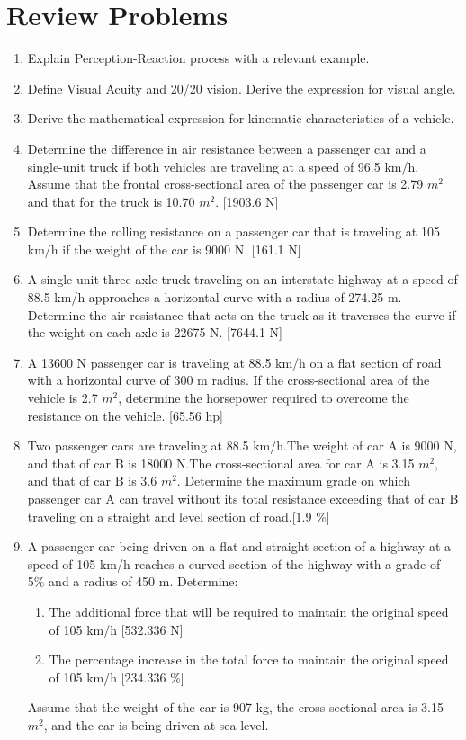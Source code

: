 \section{Review Problems}
\begin{enumerate}
	\item  Explain Perception-Reaction process with a relevant example.
	\item  Define Visual Acuity and 20/20 vision. Derive the expression for visual angle.
	\item  Derive the mathematical expression for kinematic characteristics of a vehicle.
	\item Determine the difference in air resistance between a passenger car and a single-unit truck if both vehicles are traveling at a speed of 96.5 km/h. Assume that the frontal cross-sectional area of the passenger car is 2.79 $ m^2 $ and that for the truck is 10.70 $ m^2 $. [1903.6 N]
	\item Determine the rolling resistance on a passenger car that is traveling at 105 km/h if the weight of the car is 9000 N. [161.1 N]
	\item A single-unit three-axle truck traveling on an interstate highway at a speed of 88.5 km/h approaches a horizontal curve with a radius of 274.25 m. Determine the air resistance that acts on the truck as it traverses the curve if the weight on each axle is 22675 N. [7644.1 N]
	\item A 13600 N passenger car is traveling at 88.5 km/h on a flat section of road with a horizontal curve of 300 m radius. If the cross-sectional area of the vehicle is 2.7 $ m^2 $, determine the horsepower required to overcome the resistance on the vehicle. [65.56 hp]
	\item Two passenger cars are traveling at 88.5 km/h.The weight of car A is 9000 N, and that of car B is 18000 N.The cross-sectional area for car A is 3.15 $ m^2 $, and that of car B is 3.6 $ m^2 $. Determine the maximum grade on which passenger car A can travel without its total resistance exceeding that of car B traveling on a straight and level section of road.[1.9 \%]
	\item A passenger car being driven on a flat and straight section of a highway at a speed of 105 km/h reaches a curved section of the highway with a grade of 5\% and a radius of 450 m. Determine:
		\begin{enumerate}
			\item The additional force that will be required to maintain the original speed of 105 km/h [532.336 N]
			\item The percentage increase in the total force to maintain the original speed of 105 km/h [234.336 \%]
		\end{enumerate}
	Assume that the weight of the car is 907 kg, the cross-sectional area is 3.15 $ m^2 $, and the car is being driven at sea level.
\end{enumerate}




